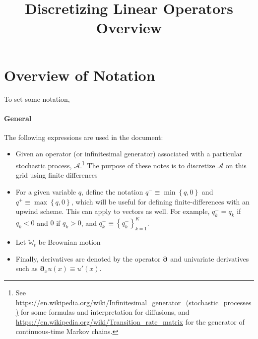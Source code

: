 \documentclass[11pt]{article}
\newcommand{\set}[1]{\ensuremath{\left\{{#1}\right\}}}
\newcommand{\D}[1][]{\ensuremath{\boldsymbol{\partial}_{#1}}}
\newcommand{\A}{\ensuremath{\mathcal{A}}}
\begin{document}
	\title{Discretizing Linear Operators Overview}
	\author{}
	\date{}
	\maketitle
	\section{Overview of Notation}
	To set some notation,
	\paragraph{General}
	
	The following expressions are used in the document:
	\begin{itemize}
		\item Given an operator (or infinitesimal generator) associated with a particular stochastic process, $\A$.\footnote{See \url{https://en.wikipedia.org/wiki/Infinitesimal_generator_(stochastic_processes)} for some formulas and interpretation for diffusions, and \url{https://en.wikipedia.org/wiki/Transition_rate_matrix} for the generator of continuous-time Markov chains.}  The purpose of these notes is to discretize $\A$ on this grid using finite differences
		\item For a given variable $q$, define the notation $q^{-} \equiv \min\set{q,0}$ and $q^{+} \equiv \max\set{q,0}$, which will be useful for defining finite-differences with an upwind scheme.  This can apply to vectors as well. For example, $q_k^{-} = q_k$ if $q_k < 0$ and $0$ if $q_k > 0$, and $q_k^{-} \equiv \set{q^{-}_k}_{k=1}^{K}$.
		\item Let $\mathbb{W}_t$ be Brownian motion
		\item Finally, derivatives are denoted by the operator $\D$ and univariate derivatives such as $\D[x]u(x) \equiv u'(x)$.
	\end{itemize}
	
\end{document}
